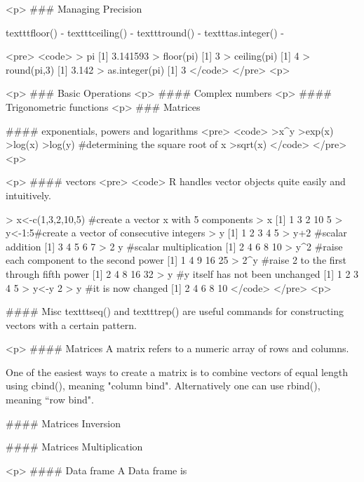 
<p>
### {Managing Precision}

texttt{floor()} - 
texttt{ceiling()} - 
texttt{round()} - 
texttt{as.integer()} -


<pre>
<code>
> pi
[1] 3.141593
> floor(pi)
[1] 3
> ceiling(pi)
[1] 4
> round(pi,3)
[1] 3.142
> as.integer(pi)
[1] 3
</code>
</pre>
<p>

<p>
### {Basic Operations}
<p>
#### {Complex numbers}
<p>
#### {Trigonometric functions}
<p>
### {Matrices}




#### {exponentials, powers and logarithms}
<pre>
<code>
>x^y
>exp(x)
>log(x)
>log(y)
#determining the square root of x
>sqrt(x)
</code>
</pre>
<p>

<p>
#### {vectors}
<pre>
<code>
R handles vector objects quite easily and intuitively.

> x<-c(1,3,2,10,5)    #create a vector x with 5 components
> x
[1]  1  3  2 10  5
> y<-1:5#create a vector of consecutive integers
> y
[1] 1 2 3 4 5
> y+2   #scalar addition
[1] 3 4 5 6 7
> 2     y   #scalar multiplication
[1]  2  4  6  8 10
> y^2   #raise each component to the second power
[1]  1  4  9 16 25
> 2^y   #raise 2 to the first through fifth power
[1]  2  4  8 16 32
> y     #y itself has not been unchanged
[1] 1 2 3 4 5
> y<-y     2
> y     #it is now changed
[1]  2  4  6  8 10
</code>
</pre>
<p>


#### {Misc}
texttt{seq()} and texttt{rep()} are useful commands for constructing vectors with a certain pattern.


<p>
#### {Matrices}
A matrix refers to a numeric array of rows and columns.

One of the easiest ways to create a matrix is to combine vectors of equal
length using cbind(), meaning "column bind". Alternatively one can use rbind(), meaning ``row bind".



#### {Matrices Inversion}

#### {Matrices Multiplication}


<p>
#### {Data frame}
A Data frame is

